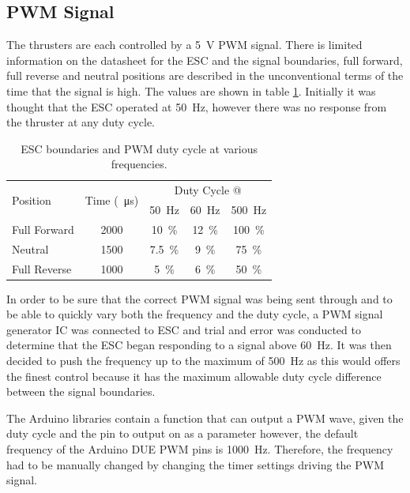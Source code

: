 \subsection{PWM Signal}
The thrusters are each controlled by a \SI{5}{\volt} PWM signal. There is limited information on the datasheet for the ESC and the signal boundaries, full forward, full reverse and neutral positions are described in the unconventional terms of the time that the signal is high. The values are shown in table \ref{tab:3:PWM}. Initially it was thought that the ESC operated at \SI{50}{\hertz}, however there was no response from the thruster at any duty cycle.\par
\begin{table}[!ht]
\begin{center}
	\caption{ESC boundaries and PWM duty cycle at various frequencies.}
	\label{tab:3:PWM}
	\begin{tabular}{|l|c|c|c|c|}
		\hline
		\multirow{2}{*}{Position} & \multirow{2}{*}{Time (\SI{}{\micro\second})} & \multicolumn{3}{c|}{Duty Cycle @}\\
		& & \multicolumn{1}{c}{\SI{50}{\hertz}} & \multicolumn{1}{c}{\SI{60}{\hertz}} & \multicolumn{1}{c|}{\SI{500}{\hertz}}\\
		\hline
		Full Forward & 2000 & \SI{10}{\percent} & \SI{12}{\percent} & \SI{100}{\percent}  \\
		\hline
		Neutral & 1500 & \SI{7.5}{\percent} & \SI{9}{\percent} & \SI{75}{\percent}  \\
		\hline
		Full Reverse & 1000 & \SI{5}{\percent} & \SI{6}{\percent} & \SI{50}{\percent}  \\
		\hline
	\end{tabular}
\end{center}
\end{table}
\vspace{0.4cm}
In order to be sure that the correct PWM signal was being sent through and to be able to quickly vary both the frequency and the duty cycle, a PWM signal generator IC was connected to ESC and trial and error was conducted to determine that the ESC began responding to a signal above \SI{60}{\hertz}. It was then decided to push the frequency up to the maximum of \SI{500}{\hertz} as this would offers the finest control because it has the maximum allowable duty cycle difference between the signal boundaries.\par
\vspace{0.4cm}
The Arduino libraries contain a function that can output a PWM wave, given the duty cycle and the pin to output on as a parameter however, the default frequency of the Arduino DUE PWM pins is \SI{1000}{\hertz}. Therefore, the frequency had to be manually changed by changing the timer settings driving the PWM signal.\par
